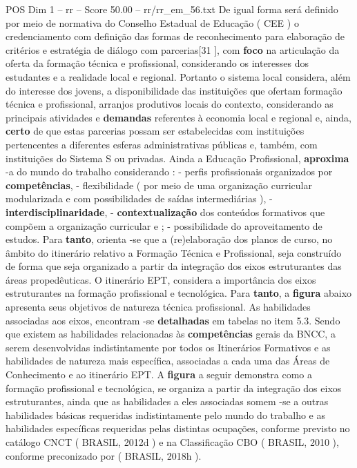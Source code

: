 \begin{textsample}{POS Dim 1 – rr – Score 50.00 – rr/rr\_em\_56.txt}
De igual forma será definido por meio de normativa do Conselho Estadual de Educação ( CEE ) o credenciamento com definição das formas de reconhecimento para elaboração de critérios e estratégia de diálogo com parcerias[31 ], com \textbf{foco} na articulação da oferta da formação técnica e profissional, considerando os interesses dos estudantes e a realidade local e regional.
Portanto o sistema local considera, além do interesse dos jovens, a disponibilidade das instituições que ofertam formação técnica e profissional, arranjos produtivos locais do contexto, considerando as principais atividades e \textbf{demandas} referentes à economia local e regional e, ainda, \textbf{certo} de que estas parcerias possam ser estabelecidas com instituições pertencentes a diferentes esferas administrativas públicas e, também, com instituições do Sistema S ou privadas.
Ainda a Educação Profissional, \textbf{aproxima} -a do mundo do trabalho considerando : - perfis profissionais organizados por \textbf{competências}, - flexibilidade ( por meio de uma organização curricular modularizada e com possibilidades de saídas intermediárias ), - \textbf{interdisciplinaridade}, - \textbf{contextualização} dos conteúdos formativos que compõem a organização curricular e ; - possibilidade do aproveitamento de estudos.
Para \textbf{tanto}, orienta -se que a (re)elaboração dos planos de curso, no âmbito do itinerário relativo a Formação Técnica e Profissional, seja construído de forma que seja organizado a partir da integração dos eixos estruturantes das áreas propedêuticas.
O itinerário EPT, considera a importância dos eixos estruturantes na formação profissional e tecnológica.
Para \textbf{tanto}, a \textbf{figura} abaixo apresenta seus objetivos de natureza técnica profissional.
As habilidades associadas aos eixos, encontram -se \textbf{detalhadas} em tabelas no item 5.3.
Sendo que existem as habilidades relacionadas às \textbf{competências} gerais da BNCC, a serem desenvolvidas indistintamente por todos os Itinerários Formativos e as habilidades de natureza mais específica, associadas a cada uma das Áreas de Conhecimento e ao itinerário EPT.
A \textbf{figura} a seguir demonstra como a formação profissional e tecnológica, se organiza a partir da integração dos eixos estruturantes, ainda que as habilidades a eles associadas somem -se a outras habilidades básicas requeridas indistintamente pelo mundo do trabalho e as habilidades específicas requeridas pelas distintas ocupações, conforme previsto no catálogo CNCT ( BRASIL, 2012d ) e na Classificação CBO ( BRASIL, 2010 ), conforme preconizado por ( BRASIL, 2018h ).

\end{textsample}

